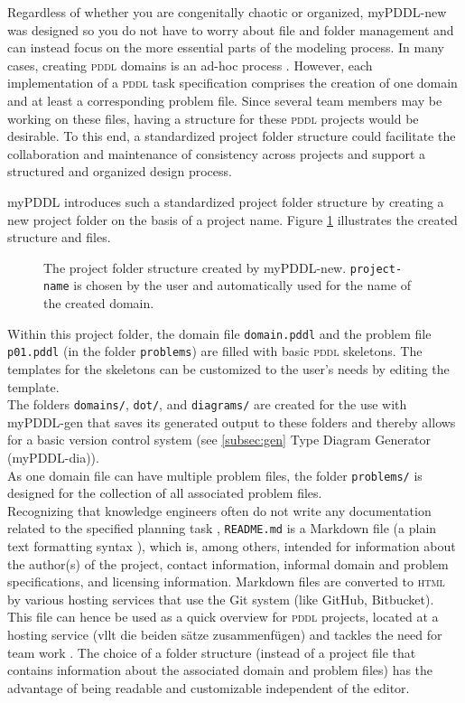 \documentclass[a4paper,12pt]{report}
\newcommand{\mypddl}{\smallerft[0.8]{myPDDL}\xspace}
\newcommand{\pddl}{\textsc{pddl}\xspace}
\newcommand\smallerft[2][0.85]{{\scalefont{#1}#2}}
\begin{document}
Regardless of whether you are congenitally chaotic or organized,
\mypddl-new was designed so you do not have to worry about file and
folder management and can instead focus on the more essential parts of
the modeling process. In many cases, creating \pddl domains is an
ad-hoc process \cite{shah2013exploring}. However, each implementation
of a \pddl task specification comprises the creation of one domain and
at least a corresponding problem file. Since several team members may
be working on these files, having a structure for these \pddl projects
would be desirable. To this end, a standardized project folder
structure could facilitate the collaboration and maintenance of
consistency across projects and support a structured and organized
design process.

\mypddl introduces such a standardized project folder structure by
creating a new project folder on the basis of a project name. Figure
\ref{fig:mypddl-new-folder} illustrates the created structure and
files.

\begin{figure}[h] 
\caption[]{\label{fig:mypddl-new-folder}The project folder structure created by myPDDL-new.
\texttt{project-name} is chosen by the user and automatically used for the name
of the created domain.}
\end{figure}
Within this project folder, the domain file \texttt{domain.pddl} and the
problem file \texttt{p01.pddl} (in the folder \texttt{problems}) are filled with
basic \pddl skeletons. The templates for the skeletons can be
customized to the user's needs by editing the template. \\
The folders \texttt{domains/}, \texttt{dot/}, and \texttt{diagrams/} are created for the
use with \mypddl-gen that saves its generated output to these folders
and thereby allows for a basic version control system (see \ref{subsec:gen}
Type Diagram Generator (\mypddl-dia)). \\
As one domain file can have multiple problem files, the folder
\texttt{problems/} is designed for the collection of all associated problem
files. \\
Recognizing that knowledge engineers often do not write any
documentation related to the specified planning task
\cite{shah2013knowledge}, \texttt{README.md} is a Markdown file (a plain text
formatting syntax \cite{gruber2004markdown}), which is, among others,
intended for information about the author(s) of the project, contact
information, informal domain and problem specifications, and licensing
information. Markdown files are converted to \textsc{html} by various
hosting services that use the Git system (like GitHub, Bitbucket).
This file can hence be used as a quick overview for \pddl projects,
located at a hosting service (vllt die beiden sätze zusammenfügen) and
tackles the need for team work \cite{shah2013knowledge}. The choice of
a folder structure (instead of a project file that contains
information about the associated domain and problem files) has the
advantage of being readable and customizable independent of the
editor.
\end{document}
